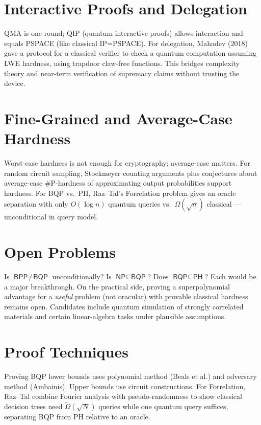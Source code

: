\section{Interactive Proofs and Delegation}
QMA is one round; QIP (quantum interactive proofs) allows interaction and equals PSPACE (like classical IP=PSPACE). For delegation, Mahadev (2018) gave a protocol for a classical verifier to check a quantum computation assuming LWE hardness, using trapdoor claw-free functions. This bridges complexity theory and near-term verification of supremacy claims without trusting the device.


\section{Fine-Grained and Average-Case Hardness}
Worst-case hardness is not enough for cryptography; average-case matters. For random circuit sampling, Stockmeyer counting arguments plus conjectures about average-case \#P-hardness of approximating output probabilities support hardness. For BQP vs.\ PH, Raz--Tal's Forrelation problem gives an oracle separation with only $O(\log n)$ quantum queries vs.\ $\Omega(\sqrt n)$ classical --- unconditional in query model.


\section{Open Problems}
Is $\textsf{BPP}\neq\textsf{BQP}$ unconditionally? Is $\textsf{NP}\subseteq\textsf{BQP}$? Does $\textsf{BQP}\subseteq\textsf{PH}$? Each would be a major breakthrough. On the practical side, proving a superpolynomial advantage for a \emph{useful} problem (not oracular) with provable classical hardness remains open. Candidates include quantum simulation of strongly correlated materials and certain linear-algebra tasks under plausible assumptions.


\section{Proof Techniques}
Proving BQP lower bounds uses polynomial method (Beals et al.) and adversary method (Ambainis). Upper bounds use circuit constructions. For Forrelation, Raz--Tal combine Fourier analysis with pseudo-randomness to show classical decision trees need $\tilde\Omega(\sqrt N)$ queries while one quantum query suffices, separating BQP from PH relative to an oracle.



